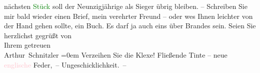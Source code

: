                nächsten \textcolor{green}{Stück}{} soll der
               Neunzigjährige als Sieger übrig bleiben.\pend
           \pstart
           {\pb}– Schreiben Sie mir bald wieder einen Brief, mein
               verehrter Freund – oder we{\geminationn}s Ihnen leichter von der Hand
               gehen sollte, ein Buch. Es darf ja auch eins über Brandes sein.\pend
           \pstart
           Seien Sie herzlichst gegrüßt von{\\[\baselineskip]}Ihrem getreuen{\\[\baselineskip]}\spacefill\mbox{Arthur Schnitzler}\pend
           \leftskip=0em{}\pstart
           \noindent{}Verzeihen Sie die Klexe! Fließende Tinte – neue \textcolor{pink}{englische}{}\ledrightnote{\textcolor{pink}{England}} Feder, – Ungeschicklichkeit. –\pend
           \endnumbering{}  
      